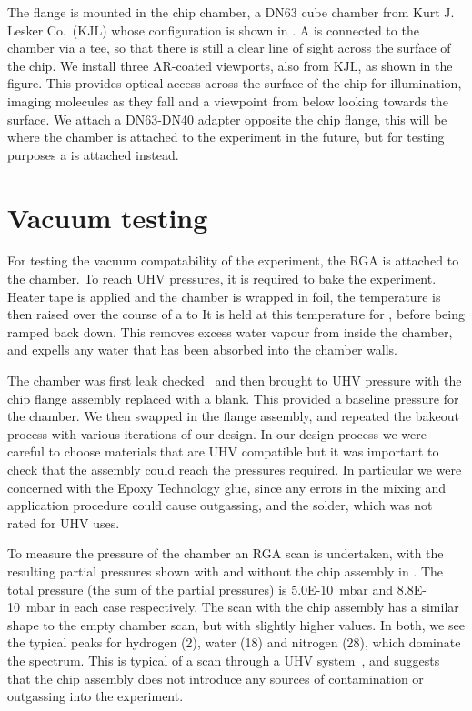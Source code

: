 The flange is mounted in the chip chamber, a DN63 cube chamber from Kurt J.
Lesker Co.\ (KJL) whose configuration is shown in .
A  is connected to the chamber via a tee, so that there is still
a clear line of sight across the surface of the chip. We install three
AR-coated viewports, also from KJL, as shown in the figure. This provides
optical access across the surface of the chip for illumination, imaging
molecules as they fall and a viewpoint from below looking towards the surface.
We attach a DN63-DN40 adapter opposite the chip flange, this will be where the
chamber is attached to the \CaF{} experiment in the future, but for testing
purposes a  is attached instead.

\begin{figure}
  \centering
  \caption{}
  \label{exper:fig:chamber}
\end{figure}



\section{Vacuum testing}

For testing the vacuum compatability of the experiment, the RGA is attached to
the chamber. To reach UHV pressures, it is required to bake the experiment.
Heater tape is applied and the chamber is wrapped in foil, the temperature is
then raised over the course of a  to   It
is held at this temperature for , before being ramped back
down. This removes excess water vapour from inside the chamber, and expells any
water that has been absorbed into the chamber walls.

The chamber was first leak checked~\cite{} and then brought to UHV pressure
with the chip flange assembly replaced with a blank. This provided a baseline
pressure for the chamber. We then swapped in the flange assembly, and repeated
the bakeout process with various iterations of our design. In our design
process we were careful to choose materials that are UHV compatible but it was
important to check that the assembly could reach the pressures required. In
particular we were concerned with the Epoxy Technology glue, since any errors
in the mixing and application procedure could cause outgassing, and the solder,
which was not rated for UHV uses.

To measure the pressure of the chamber an RGA scan is undertaken, with the
resulting partial pressures shown with and without the chip assembly in
. The total pressure (the sum of the partial pressures)
is \SI{5.0E-10}{\milli\bar} and \SI{8.8E-10}{\milli\bar} in each case respectively. The scan with the chip assembly
has a similar shape to the empty chamber scan, but with slightly higher values.
In both, we see the typical peaks for hydrogen (2), water (18) and nitrogen
(28), which dominate the spectrum. This is typical of a scan through a UHV
system~\cite{}, and suggests that the chip assembly does not introduce any
sources of contamination or outgassing into the experiment.

